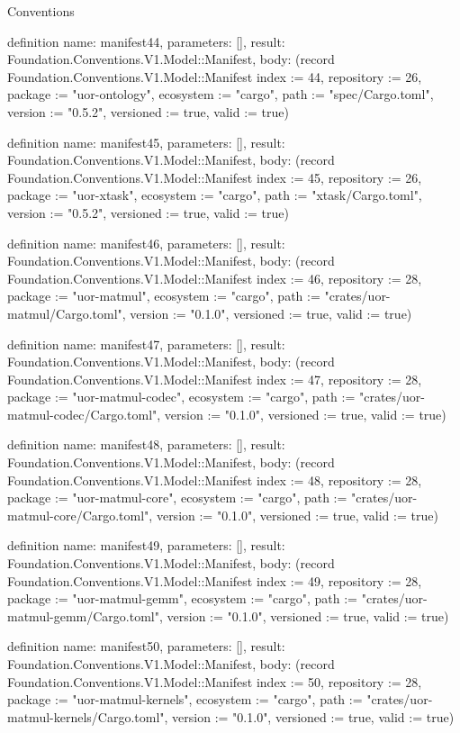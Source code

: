 \begin{lexlean}{Conventions}
\begin{semanticmodule}
definition{
  name: manifest44,
  parameters: [],
  result: Foundation.Conventions.V1.Model::Manifest,
  body: (record Foundation.Conventions.V1.Model::Manifest {index := 44, repository := 26, package := "uor-ontology", ecosystem := "cargo", path := "spec/Cargo.toml", version := "0.5.2", versioned := true, valid := true})
}

definition{
  name: manifest45,
  parameters: [],
  result: Foundation.Conventions.V1.Model::Manifest,
  body: (record Foundation.Conventions.V1.Model::Manifest {index := 45, repository := 26, package := "uor-xtask", ecosystem := "cargo", path := "xtask/Cargo.toml", version := "0.5.2", versioned := true, valid := true})
}

definition{
  name: manifest46,
  parameters: [],
  result: Foundation.Conventions.V1.Model::Manifest,
  body: (record Foundation.Conventions.V1.Model::Manifest {index := 46, repository := 28, package := "uor-matmul", ecosystem := "cargo", path := "crates/uor-matmul/Cargo.toml", version := "0.1.0", versioned := true, valid := true})
}

definition{
  name: manifest47,
  parameters: [],
  result: Foundation.Conventions.V1.Model::Manifest,
  body: (record Foundation.Conventions.V1.Model::Manifest {index := 47, repository := 28, package := "uor-matmul-codec", ecosystem := "cargo", path := "crates/uor-matmul-codec/Cargo.toml", version := "0.1.0", versioned := true, valid := true})
}

definition{
  name: manifest48,
  parameters: [],
  result: Foundation.Conventions.V1.Model::Manifest,
  body: (record Foundation.Conventions.V1.Model::Manifest {index := 48, repository := 28, package := "uor-matmul-core", ecosystem := "cargo", path := "crates/uor-matmul-core/Cargo.toml", version := "0.1.0", versioned := true, valid := true})
}

definition{
  name: manifest49,
  parameters: [],
  result: Foundation.Conventions.V1.Model::Manifest,
  body: (record Foundation.Conventions.V1.Model::Manifest {index := 49, repository := 28, package := "uor-matmul-gemm", ecosystem := "cargo", path := "crates/uor-matmul-gemm/Cargo.toml", version := "0.1.0", versioned := true, valid := true})
}

definition{
  name: manifest50,
  parameters: [],
  result: Foundation.Conventions.V1.Model::Manifest,
  body: (record Foundation.Conventions.V1.Model::Manifest {index := 50, repository := 28, package := "uor-matmul-kernels", ecosystem := "cargo", path := "crates/uor-matmul-kernels/Cargo.toml", version := "0.1.0", versioned := true, valid := true})
}


\end{semanticmodule}
\end{lexlean}
